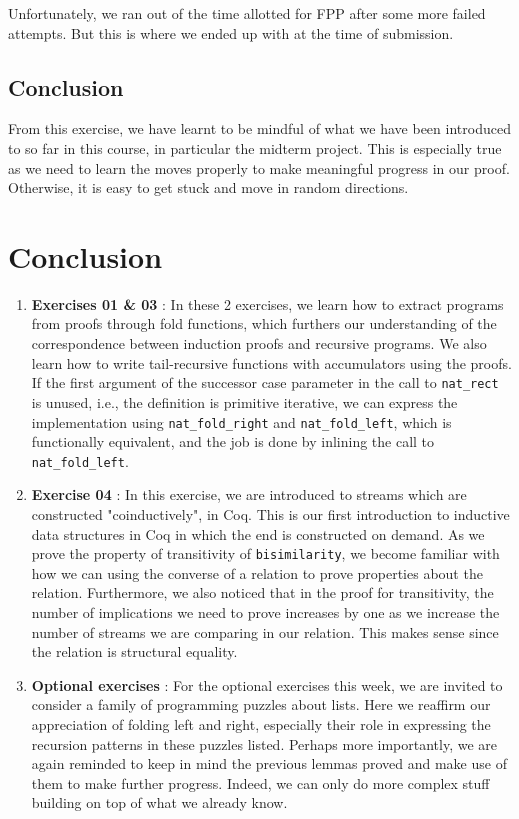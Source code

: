 \documentclass{article}
\begin{document}
Unfortunately, we ran out of the time allotted for FPP after some more failed attempts. But this is where we ended up with at the time of submission.    
\subsection{Conclusion}
From this exercise, we have learnt to be mindful of what we have been introduced to so far in this course, in particular the midterm project. This is especially true as we need to learn the moves properly to make meaningful progress in our proof. Otherwise, it is easy to get stuck and move in random directions. 

\section{Conclusion}

\begin{enumerate}
  \item \textbf{Exercises 01 \& 03} : In these 2 exercises, we learn how to extract programs from proofs through fold functions, which furthers our understanding of the correspondence between induction proofs and recursive programs. We also learn how to write tail-recursive functions with accumulators using the proofs. If the first argument of the successor case parameter in the call to \texttt{nat\_rect} is unused, i.e., the definition is primitive iterative, we can express the implementation using \texttt{nat\_fold\_right} and \texttt{nat\_fold\_left}, which is functionally equivalent, and the job is done by inlining the call to \texttt{nat\_fold\_left}.

  \item \textbf{Exercise 04} : In this exercise, we are introduced to streams which are constructed "coinductively", in Coq. This is our first introduction to inductive data structures in Coq in which the end is constructed on demand. As we prove the property of transitivity of \texttt{bisimilarity}, we become familiar with how we can using the converse of a relation to prove properties about the relation. Furthermore, we also noticed that in the proof for transitivity, the number of implications we need to prove increases by one as we increase the number of streams we are comparing in our relation. This makes sense since the relation is structural equality.

  \item \textbf{Optional exercises} : For the optional exercises this week, we are invited to consider a family of programming puzzles about lists. Here we reaffirm our appreciation of folding left and right, especially their role in expressing the recursion patterns in these puzzles listed. Perhaps more importantly, we are again reminded to keep in mind the previous lemmas proved and make use of them to make further progress. Indeed, we can only do more complex stuff building on top of what we already know.
\end{enumerate}
\end{document}

